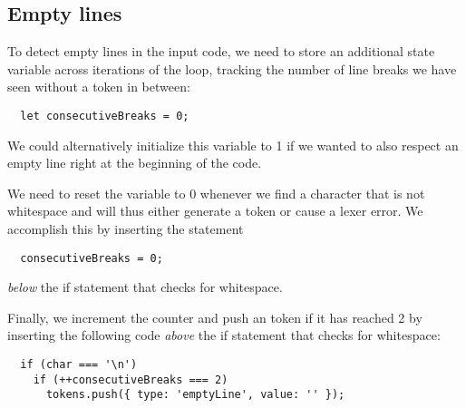 \subsection{Empty lines}
To detect empty lines in the input code,
we need to store an additional state variable
across iterations of the loop,
tracking the number of line breaks we have seen
without a token in between:
\begin{verbatim}
  let consecutiveBreaks = 0;
\end{verbatim}
We could alternatively initialize this variable to 1
if we wanted to also respect an empty line
right at the beginning of the code.

We need to reset the variable to 0
whenever we find a character
that is not whitespace and will thus either
generate a token or cause a lexer error.
We accomplish this by inserting the statement
\begin{verbatim}
  consecutiveBreaks = 0;
\end{verbatim}
\textit{below} the if statement that checks for whitespace.

Finally, we increment the  counter
and push an  token if it has reached 2
by inserting the following code
\textit{above} the if statement that checks for whitespace:
\begin{verbatim}
  if (char === '\n')
    if (++consecutiveBreaks === 2)
      tokens.push({ type: 'emptyLine', value: '' });
\end{verbatim}
